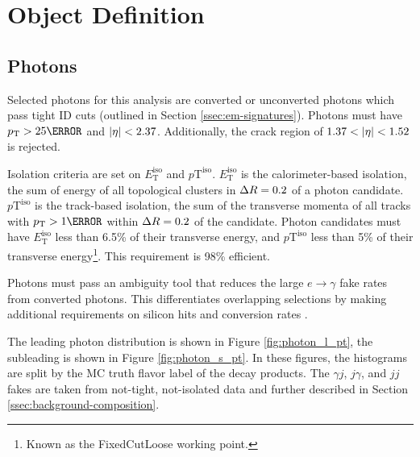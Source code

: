 \section{Object Definition}
\subsection{Photons}

Selected photons for this analysis are converted or unconverted photons which pass tight ID cuts (outlined in Section \ref{ssec:em-signatures}). Photons must have $\pt > \unit{25}{\GeV}$ and $|\eta| < 2.37$. Additionally, the crack region of $1.37 < |\eta| < 1.52$ is rejected.

Isolation criteria are set on $E_{\text{T}}^{\text{iso}}$ and $p{\text{T}}^{\text{iso}}$. $E_{\text{T}}^{\text{iso}}$ is the calorimeter-based isolation, the sum of energy of all topological clusters in $\Delta R = 0.2$ of a photon candidate. $p{\text{T}}^{\text{iso}}$ is the track-based isolation, the sum of the transverse momenta of all tracks with $\pt > \unit{1}{\GeV}$ within $\Delta R = 0.2$ of the candidate. Photon candidates must have $E_{\text{T}}^{\text{iso}}$ less than 6.5\% of their transverse energy, and $p{\text{T}}^{\text{iso}}$ less than 5\% of their transverse energy\footnote{Known as the FixedCutLoose working point.}. This requirement is 98\% efficient. 


Photons must pass an ambiguity tool that reduces the large $e\rightarrow\gamma$ fake rates from converted photons. This differentiates overlapping selections by making additional requirements on silicon hits and conversion rates \cite{r1-photonID}.

The leading photon \pt distribution is shown in Figure \ref{fig:photon_l_pt}, the subleading is shown in Figure \ref{fig:photon_s_pt}. In these figures, the histograms are split by the \gls{MC} truth flavor label of the \Hbb decay products. The $\gamma j$, $j\gamma$, and $jj$ fakes are taken from not-tight, not-isolated data and further described in Section \ref{ssec:background-composition}.

